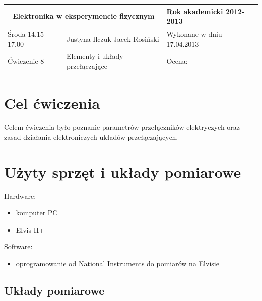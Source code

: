 \documentclass[a4paper,11pt]{article}
\author{Justyna Ilczuk, Jacek Rosiński}
\begin{document}
\begin{center}

    \begin{tabular}{ | m{5cm}| m{5cm} | m{5cm} |}
    \hline 
    \multicolumn{2}{|c|}{Elektronika w eksperymencie fizycznym}
    & Rok akademicki 2012-2013 \\ 
    
    \hline
    Środa 14.15-17.00 
    & Justyna Ilczuk \newline Jacek Rosiński
    & Wykonane w dniu 17.04.2013 \\
   	
   	\hline
   	Ćwiczenie 8 & Elementy i układy przełączające &    Ocena: \\
   	\hline
    \end{tabular}
\end{center}

\pagestyle{fancy}
\fancyfoot[CO]{\ }
\fancyhead[RO]{\footnotesize{\thepage} }




\section{Cel ćwiczenia}
Celem ćwiczenia było poznanie parametrów przełączników elektryczych oraz zasad działania elektroniczych układów przełączających.

\section{Użyty sprzęt i układy pomiarowe}

Hardware:
\begin{itemize}
\item komputer PC
\item Elvis II+
\end{itemize}

Software:
\begin{itemize}
\item oprogramowanie od National Instruments do pomiarów na Elvisie

\end{itemize}

\subsection{Układy pomiarowe}
\end{document}
